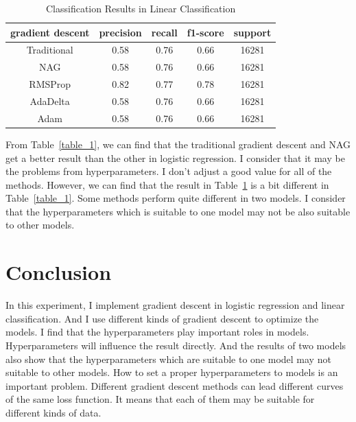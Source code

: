 \documentclass[journal, a4paper]{IEEEtran}
\begin{document}
    \begin{table}[!hbt]
		\begin{center}
		\caption{Classification Results in Linear Classification}
		\label{table_2}
		\begin{tabular}{|c|c|c|c|c|}
			\hline
			gradient descent  & precision & recall & f1-score & support \\
			\hline
			Traditional & 0.58 & 0.76 & 0.66 & 16281 \\
			\hline
			NAG & 0.58 & 0.76 & 0.66  & 16281 \\
			\hline
			RMSProp & 0.82 & 0.77 & 0.78 & 16281 \\
			\hline
            AdaDelta & 0.58 & 0.76 & 0.66 & 16281 \\
			\hline
            Adam & 0.58 & 0.76 & 0.66 & 16281 \\
			\hline
		\end{tabular}
		\end{center}
	\end{table}

From Table~\ref{table_1}, we can find that the traditional gradient descent and NAG get a better result than the other in logistic regression. I consider that it may be the problems from hyperparameters. I don't adjust a good value for all of the methods. However, we can find that the result in Table~\ref{table_2} is a bit different in Table~\ref{table_1}. Some methods perform quite different in two models. I consider that the hyperparameters which is suitable to one model may not be also suitable to other models.

\section{Conclusion}
In this experiment, I implement gradient descent in logistic regression and linear classification. And I use different kinds of gradient descent to optimize the models. I find that the hyperparameters play important roles in models. Hyperparameters will influence the result directly. And the results of two models also show that the hyperparameters which are suitable to one model may not suitable to other models. How to set a proper hyperparameters to models is an important problem. Different gradient descent methods can lead different curves of the same loss function. It means that each of them may be suitable for different kinds of data.

\end{document}
